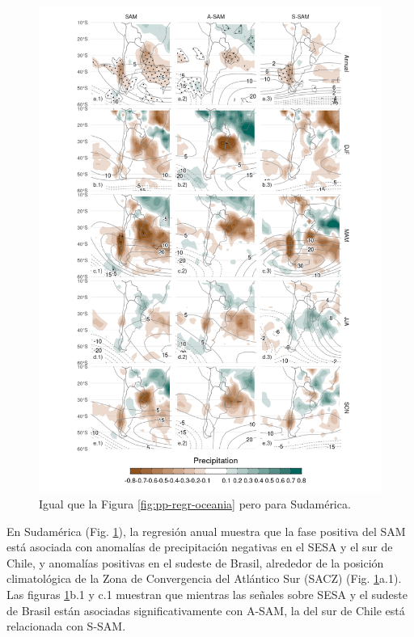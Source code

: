 \documentclass[12pt,oneside,a4paper]{reedthesis}
\begin{document}
\begin{figure}

{\centering \includegraphics{figures/30-sam/pp-regr-america-1} 

}

\caption{Igual que la Figura \ref{fig:pp-regr-oceania} pero para Sudamérica.}\label{fig:pp-regr-america}
\end{figure}

En Sudamérica (Fig. \ref{fig:pp-regr-america}), la regresión anual muestra que la fase positiva del SAM está asociada con anomalías de precipitación negativas en el SESA y el sur de Chile, y anomalías positivas en el sudeste de Brasil, alrededor de la posición climatológica de la Zona de Convergencia del Atlántico Sur (SACZ) (Fig. \ref{fig:pp-regr-america}a.1).
Las figuras \ref{fig:pp-regr-america}b.1 y c.1 muestran que mientras las señales sobre SESA y el sudeste de Brasil están asociadas significativamente con A-SAM, la del sur de Chile está relacionada con S-SAM.
\end{document}
